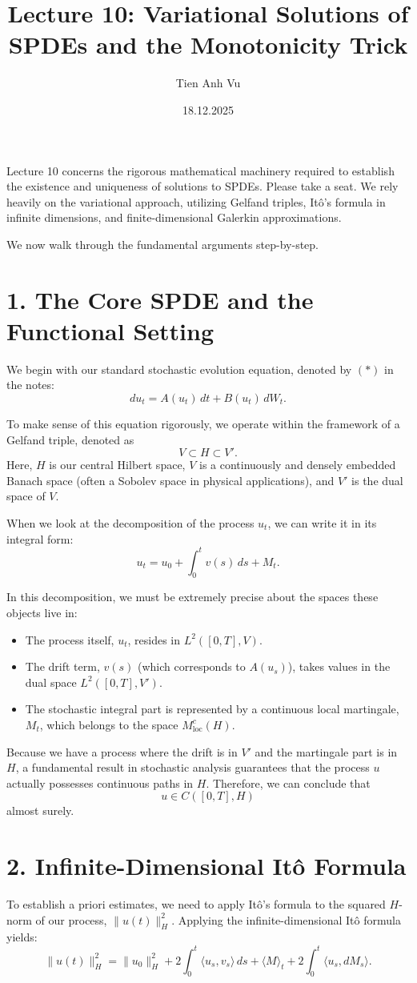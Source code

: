 \documentclass[11pt]{article}
\title{Lecture 10: Variational Solutions of SPDEs and the Monotonicity Trick}
\date{18.12.2025}
\author{Tien Anh Vu}
\theoremstyle{definition}
\theoremstyle{remark}
\begin{document}
\maketitle

Lecture 10 concerns the rigorous mathematical machinery required to establish the existence and uniqueness of solutions to SPDEs. Please take a seat. We rely heavily on the variational approach, utilizing Gelfand triples, It\^o's formula in infinite dimensions, and finite-dimensional Galerkin approximations.

We now walk through the fundamental arguments step-by-step.

\section*{1. The Core SPDE and the Functional Setting}
We begin with our standard stochastic evolution equation, denoted by $(\ast)$ in the notes:
\[
  du_t = A(u_t)\,dt + B(u_t)\,dW_t.
\]

To make sense of this equation rigorously, we operate within the framework of a Gelfand triple, denoted as
\[
  V \subset H \subset V'.
\]
Here, $H$ is our central Hilbert space, $V$ is a continuously and densely embedded Banach space (often a Sobolev space in physical applications), and $V'$ is the dual space of $V$.

When we look at the decomposition of the process $u_t$, we can write it in its integral form:
\[
  u_t = u_0 + \int_0^t v(s)\,ds + M_t.
\]

In this decomposition, we must be extremely precise about the spaces these objects live in:
\begin{itemize}
\item The process itself, $u_t$, resides in $L^2([0,T],V)$.
\item The drift term, $v(s)$ (which corresponds to $A(u_s)$), takes values in the dual space $L^2([0,T],V')$.
\item The stochastic integral part is represented by a continuous local martingale, $M_t$, which belongs to the space $M_{\mathrm{loc}}^c(H)$.
\end{itemize}

Because we have a process where the drift is in $V'$ and the martingale part is in $H$, a fundamental result in stochastic analysis guarantees that the process $u$ actually possesses continuous paths in $H$. Therefore, we can conclude that
\[
  u \in C([0,T],H)
\]
almost surely.

\section*{2. Infinite-Dimensional It\^o Formula}
To establish a priori estimates, we need to apply It\^o's formula to the squared $H$-norm of our process, $\|u(t)\|_H^2$. Applying the infinite-dimensional It\^o formula yields:
\[
  \|u(t)\|_H^2
  = \|u_0\|_H^2
  + 2\int_0^t \langle u_s, v_s \rangle\,ds
  + \langle M \rangle_t
  + 2\int_0^t \langle u_s, dM_s \rangle.
\]
\end{document}
